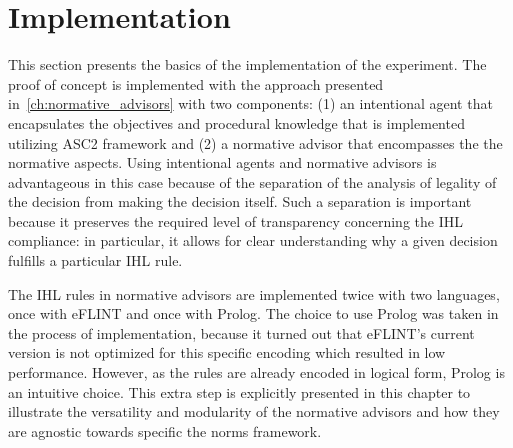 %
\section{Implementation}
This section presents the basics of the implementation of the experiment. The proof of concept is implemented with the approach presented in~\ref{ch:normative_advisors} with two components: (1) an intentional agent that encapsulates the objectives and procedural knowledge that is implemented utilizing ASC2 framework and (2) a normative advisor that encompasses the the normative aspects. Using intentional agents and normative advisors is advantageous in this case because of the separation of the analysis of legality of the decision from making the decision itself. Such a separation is important because it preserves the required level of transparency concerning the IHL compliance: in particular, it allows for clear understanding why a given decision fulfills a particular IHL rule. %

The IHL rules in normative advisors are implemented twice with two languages, once with eFLINT and once with Prolog. The choice to use Prolog was taken in the process of implementation, because it turned out that eFLINT's current version is not optimized for this specific encoding which resulted in low performance. However, as the rules are already encoded in logical form, Prolog is an intuitive choice. This extra step is explicitly presented in this chapter to illustrate the versatility and modularity of the normative advisors and how they are agnostic towards specific the norms framework.

